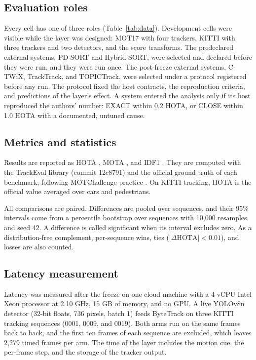 \subsection{Evaluation roles}\label{sec:roles}
Every cell has one of three roles (Table~\ref{tab:data}). Development cells
were visible while the layer was designed: MOT17 with four trackers, KITTI
with three trackers and two detectors, and the score transforms. The
predeclared external systems, PD-SORT and Hybrid-SORT, were selected and
declared before they were run, and they were run once. The post-freeze
external systems, C-TWiX, TrackTrack, and TOPICTrack, were selected under a
protocol registered before any run. The protocol fixed the host contracts, the
reproduction criteria, and predictions of the layer's effect. A system entered
the analysis only if its host reproduced the authors' number: EXACT within
0.2 HOTA, or CLOSE within 1.0 HOTA with a documented, untuned cause.

\subsection{Metrics and statistics}\label{sec:metrics}
Results are reported as HOTA \cite{luiten2021hota}, MOTA
\cite{bernardin2008clear}, and IDF1 \cite{ristani2016idf1}. They are computed
with the TrackEval library (commit 12c8791) and the official ground truth of
each benchmark, following MOTChallenge practice
\cite{dendorfer2021motchallenge}. On KITTI tracking, HOTA is the official
value averaged over cars and pedestrians.

All comparisons are paired. Differences are pooled over sequences, and their
95\% intervals come from a percentile bootstrap over sequences
\cite{efron1993bootstrap} with 10,000 resamples and seed 42. A difference is
called significant when its interval excludes zero. As a distribution-free
complement, per-sequence wins, ties ($|\Delta\mathrm{HOTA}|<0.01$), and losses
are also counted.

\subsection{Latency measurement}\label{sec:latency-setup}
Latency was measured after the freeze on one cloud machine with a 4-vCPU
Intel Xeon processor at 2.10 GHz, 15 GB of memory, and no GPU. A live YOLOv8n
detector (32-bit floats, 736 pixels, batch 1) feeds ByteTrack on three KITTI
tracking sequences (0001, 0009, and 0019). Both arms run on the same frames
back to back, and the first ten frames of each sequence are excluded, which
leaves 2,279 timed frames per arm. The time of the layer includes the motion
cue, the per-frame step, and the storage of the tracker output.
